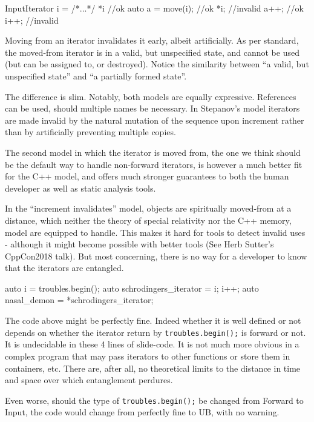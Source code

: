 \documentclass{wg21}
\begin{document}
\begin{codeblock}
	InputIterator i = /*...*/
	*i           //ok
	auto a = move(i); //ok
	*i;          //invalid
	a++;         //ok
	i++;         //invalid
\end{codeblock}


Moving from an iterator invalidates it early, albeit artificially. As
per standard, the moved-from iterator is in a valid, but unspecified
state, and cannot be used (but can be assigned to, or destroyed). Notice
the similarity between ``a valid, but unspecified state'' and ``a
partially formed state''.

The difference is slim. Notably, both models are equally expressive.
References can be used, should multiple names be necessary. In
Stepanov's model iterators are made invalid by the natural mutation of
the sequence upon increment rather than by artificially preventing
multiple copies.

The second model in which the iterator is moved from, the one we think
should be the default way to handle non-forward iterators, is however a
much better fit for the C++ model, and offers much stronger guarantees
to both the human developer as well as static analysis tools.

In the ``increment invalidates'' model, objects are spiritually
moved-from at a distance, which neither the theory of special relativity
nor the C++ memory, model are equipped to handle. This makes it hard for
tools to detect invalid uses - although it might become possible with
better tools (See Herb Sutter's CppCon2018 talk). But most concerning,
there is no way for a developer to know that the iterators are
entangled.

\begin{codeblock}
	auto i = troubles.begin();
	auto schrodingers_iterator = i;
	i++;
	auto nasal_demon = *schrodingers_iterator;
\end{codeblock}

The code above might be perfectly fine. Indeed whether it is well
defined or not depends on whether the iterator return by
\texttt{troubles.begin();} is forward or not. It is undecidable in these
4 lines of slide-code. It is not much more obvious in a complex program
that may pass iterators to other functions or store them in containers,
etc. There are, after all, no theoretical limits to the distance in time
and space over which entanglement perdures.

Even worse, should the type of \texttt{troubles.begin();} be changed
from Forward to Input, the code would change from perfectly fine to UB,
with no warning.
\end{document}
